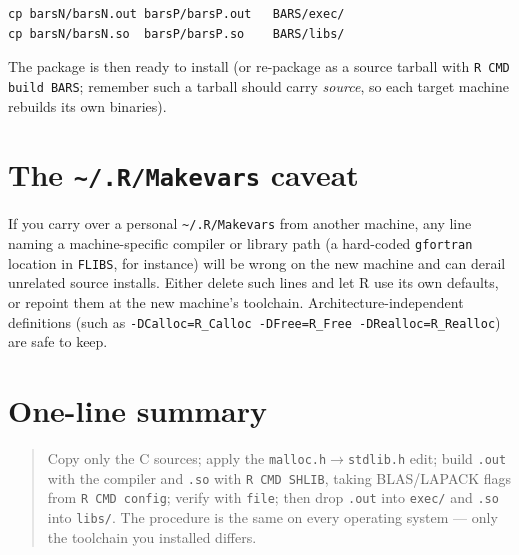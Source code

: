 \documentclass[11pt]{article}
\begin{document}
\begin{lstlisting}
cp barsN/barsN.out barsP/barsP.out   BARS/exec/
cp barsN/barsN.so  barsP/barsP.so    BARS/libs/
\end{lstlisting}

The package is then ready to install (or re-package as a source tarball with
\texttt{R CMD build BARS}; remember such a tarball should carry \emph{source},
so each target machine rebuilds its own binaries).

\section{The \texttt{\textasciitilde/.R/Makevars} caveat}

If you carry over a personal \texttt{\textasciitilde/.R/Makevars} from another
machine, any line naming a machine-specific compiler or library path (a
hard-coded \texttt{gfortran} location in \texttt{FLIBS}, for instance) will be
wrong on the new machine and can derail unrelated source installs. Either delete
such lines and let R use its own defaults, or repoint them at the new machine's
toolchain. Architecture-independent definitions (such as
\texttt{-DCalloc=R\_Calloc -DFree=R\_Free -DRealloc=R\_Realloc}) are safe to keep.

\section*{One-line summary}

\begin{quote}
Copy only the C sources; apply the \texttt{malloc.h}$\rightarrow$\texttt{stdlib.h}
edit; build \texttt{.out} with the compiler and \texttt{.so} with
\texttt{R CMD SHLIB}, taking BLAS/LAPACK flags from \texttt{R CMD config}; verify
with \texttt{file}; then drop \texttt{.out} into \texttt{exec/} and \texttt{.so}
into \texttt{libs/}. The procedure is the same on every operating system --- only
the toolchain you installed differs.
\end{quote}
\end{document}
